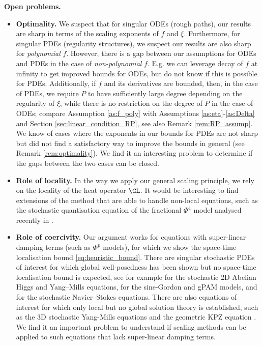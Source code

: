 \documentclass[11pt,a4paper]{article}
\numberwithin{equation}{section}
\theoremstyle{definition}
\theoremstyle{remark}
\begin{document}
\textbf{Open problems.}
\begin{itemize}
  \item \textbf{Optimality.} We suspect that for singular ODEs (rough paths), our results are sharp in terms of the scaling exponents of $f$ and $\xi$.
  Furthermore, for singular PDEs (regularity structures), we suspect our results are also sharp for \emph{polynomial} $f$.
  However, there is a gap between our assumptions for ODEs and PDEs in the case of \emph{non-polynomial} $f$. E.g. we can leverage decay of $f$ at infinity to get improved bounds for ODEs, but do not know if this is possible for PDEs.
  Additionally, if $f$ and its derivatives are bounded, then, in the case of PDEs, we require $P$ to have sufficiently large degree depending on the regularity of $\xi$, while there is no restriction on the degree of $P$ in the case of ODEs;
  compare Assumption \ref{as:f_poly} with Assumptions \ref{as:eta}-\ref{as:Delta} and Section \ref{sec:linear_condition_RP},
  see also Remark \ref{rem:RP_assump}.
  We know of cases where the exponents in our bounds for PDEs
  are not sharp but did not find a satisfactory way to improve the bounds in general (see Remark \ref{rem:optimality}).
  We find it an interesting problem to determine if the gaps between the two cases can be closed.
  
  \item \textbf{Role of locality.}
  In the way we apply our general scaling principle, we rely on the locality of the heat operator $\CL$.
  It would be interesting to find extensions of the method that are able to handle non-local equations, such as the stochastic quantisation equation of the fractional $\Phi^4$ model analysed recently in \cite{Esquivel_Weber_24_fractional,DGR_23_fractional}.
  
  \item \textbf{Role of coercivity.}
  Our argument works for equations with super-linear damping terms (such as $\Phi^p$ models), for which we show the space-time localisation bound \eqref{eq:heuristic_bound}.
  There are singular stochastic PDEs of interest for which global well-posedness has been shown but no space-time localisation bound is expected, see for example \cite{BringmannCaoHiggs,ChevyrevShen23} for the stochastic 2D Abelian Higgs and Yang--Mills equations, \cite{BC24SG,CLFW24, SZZ25_gPAM} for the sine-Gordon and gPAM models, and \cite{Hairer_Rosati_NS,Hairer_Zhao_25_NS} for the stochastic Navier--Stokes equations.
  There are also equations of interest for which only local but no global solution theory is established,
  such as the 3D stochastic Yang-Mills equations \cite{CCHS_3D} and the geometric KPZ equation \cite{BGHZ22}.
  We find it an important problem to understand if scaling methods can be applied to such equations that lack super-linear damping terms. 
\end{itemize}
\end{document}
